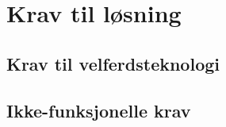 \chapter{Krav til løsning}
\label{ch:requirements}
\blindtext

\section{Krav til velferdsteknologi}
\blindtext

\section{Ikke-funksjonelle krav}
\blindtext